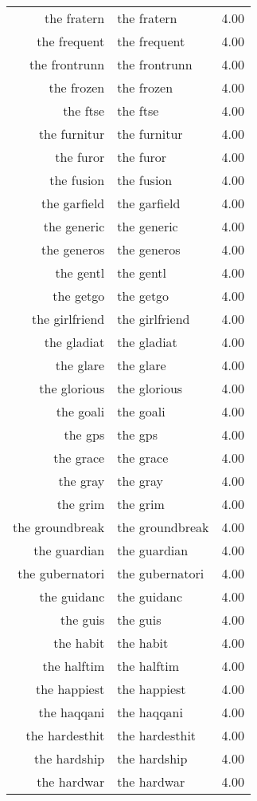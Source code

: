 \begin{table}[ht]
\begin{tabular}{rlr}
  the fratern & the fratern & 4.00 \\ 
  the frequent & the frequent & 4.00 \\ 
  the frontrunn & the frontrunn & 4.00 \\ 
  the frozen & the frozen & 4.00 \\ 
  the ftse & the ftse & 4.00 \\ 
  the furnitur & the furnitur & 4.00 \\ 
  the furor & the furor & 4.00 \\ 
  the fusion & the fusion & 4.00 \\ 
  the garfield & the garfield & 4.00 \\ 
  the generic & the generic & 4.00 \\ 
  the generos & the generos & 4.00 \\ 
  the gentl & the gentl & 4.00 \\ 
  the getgo & the getgo & 4.00 \\ 
  the girlfriend & the girlfriend & 4.00 \\ 
  the gladiat & the gladiat & 4.00 \\ 
  the glare & the glare & 4.00 \\ 
  the glorious & the glorious & 4.00 \\ 
  the goali & the goali & 4.00 \\ 
  the gps & the gps & 4.00 \\ 
  the grace & the grace & 4.00 \\ 
  the gray & the gray & 4.00 \\ 
  the grim & the grim & 4.00 \\ 
  the groundbreak & the groundbreak & 4.00 \\ 
  the guardian & the guardian & 4.00 \\ 
  the gubernatori & the gubernatori & 4.00 \\ 
  the guidanc & the guidanc & 4.00 \\ 
  the guis & the guis & 4.00 \\ 
  the habit & the habit & 4.00 \\ 
  the halftim & the halftim & 4.00 \\ 
  the happiest & the happiest & 4.00 \\ 
  the haqqani & the haqqani & 4.00 \\ 
  the hardesthit & the hardesthit & 4.00 \\ 
  the hardship & the hardship & 4.00 \\ 
  the hardwar & the hardwar & 4.00 \\ 

\end{tabular}
\end{table}

